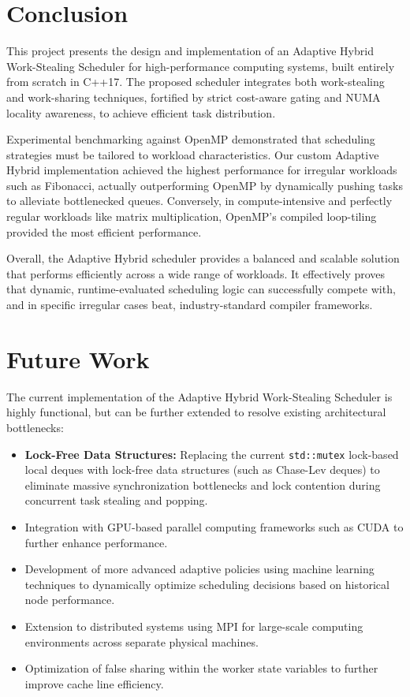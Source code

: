 \documentclass[12pt,a4paper]{article}
\begin{document}
\newpage
\section{Conclusion}

This project presents the design and implementation of an Adaptive Hybrid Work-Stealing Scheduler for high-performance computing systems, built entirely from scratch in C++17. The proposed scheduler integrates both work-stealing and work-sharing techniques, fortified by strict cost-aware gating and NUMA locality awareness, to achieve efficient task distribution.

Experimental benchmarking against OpenMP demonstrated that scheduling strategies must be tailored to workload characteristics. Our custom Adaptive Hybrid implementation achieved the highest performance for irregular workloads such as Fibonacci, actually outperforming OpenMP by dynamically pushing tasks to alleviate bottlenecked queues. Conversely, in compute-intensive and perfectly regular workloads like matrix multiplication, OpenMP's compiled loop-tiling provided the most efficient performance. 

Overall, the Adaptive Hybrid scheduler provides a balanced and scalable solution that performs efficiently across a wide range of workloads. It effectively proves that dynamic, runtime-evaluated scheduling logic can successfully compete with, and in specific irregular cases beat, industry-standard compiler frameworks.

\newpage
\section{Future Work}

The current implementation of the Adaptive Hybrid Work-Stealing Scheduler is highly functional, but can be further extended to resolve existing architectural bottlenecks:

\begin{itemize}
\item \textbf{Lock-Free Data Structures:} Replacing the current \texttt{std::mutex} lock-based local deques with lock-free data structures (such as Chase-Lev deques) to eliminate massive synchronization bottlenecks and lock contention during concurrent task stealing and popping.
\item Integration with GPU-based parallel computing frameworks such as CUDA to further enhance performance.
\item Development of more advanced adaptive policies using machine learning techniques to dynamically optimize scheduling decisions based on historical node performance.
\item Extension to distributed systems using MPI for large-scale computing environments across separate physical machines.
\item Optimization of false sharing within the worker state variables to further improve cache line efficiency.
\end{itemize}

\newpage
{}


\end{document}
